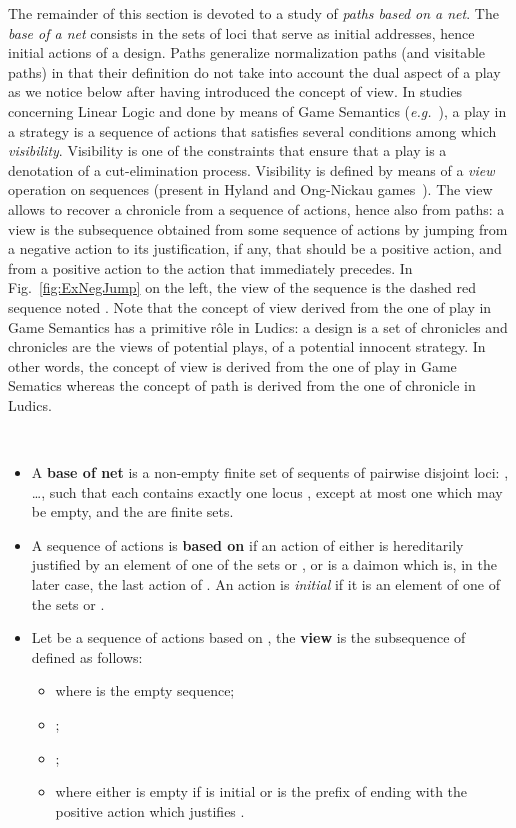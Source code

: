 \documentclass{LMCS}
\def\eg{{\em e.g.}}
\begin{document}
The remainder of this section is devoted to a study of {\em paths based on a net}. The {\em base of a net} consists in the sets of loci that serve as initial addresses, hence initial actions of a design. Paths generalize normalization paths (and visitable paths) in that their definition do not take into account the dual aspect of a play as we notice below after having introduced the concept of view. In studies concerning Linear Logic and done by means of Game Semantics (\eg\ \cite{DBLP:conf/csl/FaggianH02,Laurent05a}), a play in a strategy is a sequence of actions that satisfies several conditions among which {\em visibility}. Visibility is one of the constraints that ensure that a play is a denotation of a cut-elimination process.
Visibility is defined by means of a {\em view} operation on sequences (present in Hyland and Ong-Nickau games~\cite{HylandOng93,DBLP:conf/lfcs/Nickau94}).   
The view allows to recover a chronicle from a sequence of actions, hence also from paths: a view is the subsequence obtained from some sequence of actions by jumping from a negative action to its justification, if any, that should be a positive action, and from a positive action to the action that immediately precedes.
In Fig.~\ref{fig:ExNegJump} on the left, the view of the sequence  is the dashed red sequence noted . Note that the concept of view derived from the one of play in Game Semantics has a primitive r\^ole in Ludics: a design is a set of chronicles and chronicles are the views of potential plays, of a potential innocent strategy. In other words, the concept of view is derived from the one of play in Game Sematics whereas the concept of path is derived from the one of chronicle in Ludics.
 

\begin{defi}~
\begin{itemize}
\item A {\bf base of net}  is a non-empty finite set of sequents of pairwise disjoint loci: , \dots,
 such that each  contains exactly one locus , except at most one which may be empty, and the  are finite sets.
\item A sequence of actions  is {\bf based on } if an action of  either is hereditarily justified by an element of one of the sets  or , or is a daimon which is, in the later case, the last action of . 
An action is {\em initial} if it is an element of one of the sets  or .
\item Let  be a sequence of actions based on , the {\bf view}  is the subsequence of 
defined as follows:
\begin{itemize}[label=]
\item  where  is the empty sequence;
\item ;
\item ;
\item  where  either is empty if  is initial or is the prefix of  ending with the positive action which justifies .
\end{itemize}
\end{itemize}
\end{defi}
\end{document}
